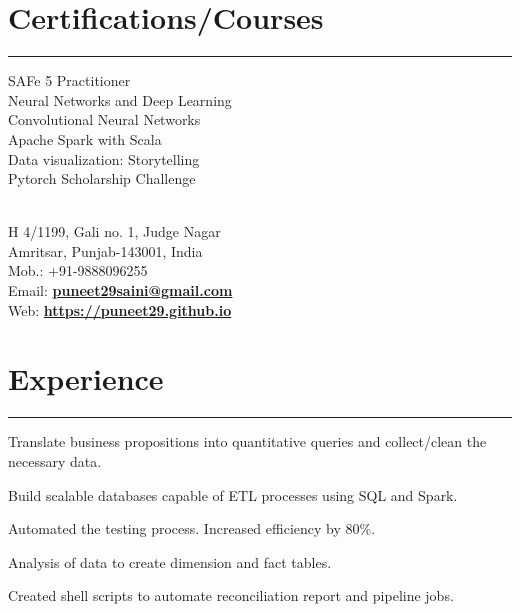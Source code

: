 \documentclass[]{puneet-resume}
\begin{document}
\begin{minipage}[t]{0.33\textwidth}
\section{Certifications/Courses}
\noindent\rule{5cm}{0.4pt}

SAFe 5 Practitioner\\
Neural Networks and Deep Learning\\
Convolutional Neural Networks\\
Apache Spark with Scala\\
Data visualization: Storytelling\\
Pytorch Scholarship Challenge
\sectionsep
%
%

\end{minipage} 
\hfill
\begin{minipage}[t]{0.66\textwidth}
\hspace*{0pt}\hfill    \\
\hspace*{0pt}\hfill H 4/1199, Gali no. 1, Judge Nagar \\
\hspace*{0pt}\hfill Amritsar, Punjab-143001, India \\
\hspace*{0pt}\hfill Mob.: +91-9888096255 \\
\hspace*{0pt}\hfill Email: \textbf{\href{mailto:puneet29saini@gmail.com}{puneet29saini@gmail.com}} \\
\hspace*{0pt}\hfill Web: \textbf{\href{https://puneet29.github.io}{https://puneet29.github.io}}
\section{Experience}
\noindent\rule{12.5cm}{0.4pt}
 
\noindent
\hspace{2.8em}%
\begin{minipage}{0.85\textwidth\vspace{2pt}}
\begin{tightemize}
	\item Translate business propositions into quantitative queries and collect/clean the necessary data.
	\item Build scalable databases capable of ETL processes using SQL and Spark.
	\item Automated the testing process. Increased efficiency by 80\%.
	\item Analysis of data to create dimension and fact tables.
	\item Created shell scripts to automate reconciliation report and pipeline jobs.
\end{tightemize}
\end{minipage}
\sectionsep


\end{minipage}
\end{document}
